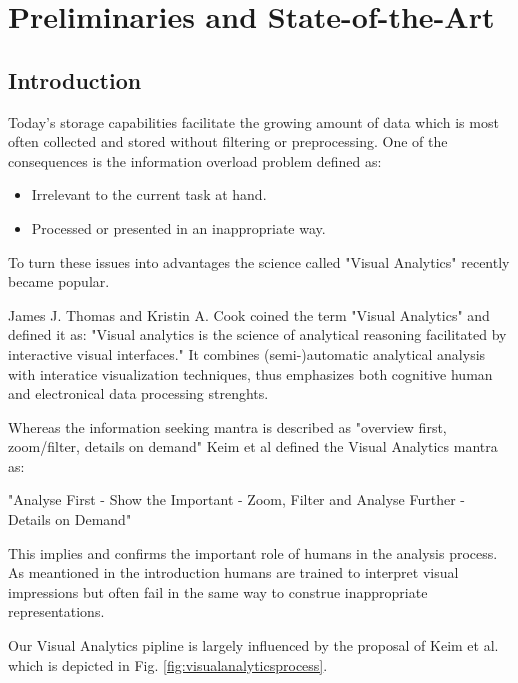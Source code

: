 \section{Preliminaries and State-of-the-Art}\label{sec::relwork} %

\subsection{Introduction}
Today's storage capabilities facilitate the growing amount of data which is most often collected and stored without filtering or preprocessing.
One of the consequences is the information overload problem defined as:

\begin{itemize}
\item Irrelevant to the current task at hand.
\item Processed or presented in an inappropriate way.
\end{itemize}

To turn these issues into advantages the science called "Visual Analytics" recently became popular. 

James J. Thomas and Kristin A. Cook coined the term "Visual Analytics"\cite{VISUAL_ANALYTICS} and defined it as: "Visual analytics is the science of analytical reasoning facilitated by interactive visual interfaces." It combines (semi-)automatic analytical analysis with interatice visualization techniques, thus emphasizes both cognitive human and electronical data processing strenghts.

Whereas the information seeking mantra is described as "overview first, zoom/filter, details on demand" Keim et al defined the Visual Analytics mantra as:

"Analyse First -
Show the Important -
Zoom, Filter and Analyse Further -
Details on Demand"\cite{keim2008visual}

This implies and confirms the important role of humans in the analysis process. As meantioned in the introduction humans are trained to interpret visual impressions but often fail in the same way to construe inappropriate representations.

Our Visual Analytics pipline is largely influenced by the proposal of Keim et al. which is depicted in Fig. \ref{fig:visualanalyticsprocess}.

